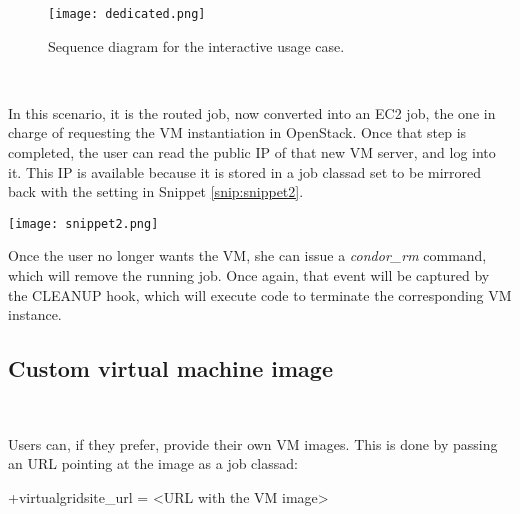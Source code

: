 \documentclass[a4paper]{jpconf}
\begin{document}
\begin{figure}[h]
    \centering
    \texttt{[image: dedicated.png]}
    \caption{Sequence diagram for the interactive usage case.}
    \label{fig:interactive}
\end{figure}

~

In this scenario, it is the routed job, now converted into an EC2 job, 
the one in charge of requesting the VM instantiation in OpenStack.
Once that step is completed, the user can read the public IP of that new VM server, and log into it. 
This IP is available because it is stored in a job classad set to be mirrored back with the setting in Snippet \ref{snip:snippet2}.

\begin{snippet}[h]
    \centering
    \renewcommand\figurename{Snippet}
    \texttt{[image: snippet2.png]}
    \caption{Setup for a classad to be mirrored from the routed job to the source job.}
    \label{snip:snippet2}
\end{snippet}


Once the user no longer wants the VM, she can issue a \textit{condor\_rm}
command, which will remove the running job. 
Once again, that event will be captured by the CLEANUP hook, which will execute
code to terminate the corresponding VM instance.


\subsection{Custom virtual machine image}

~

Users can, if they prefer, provide their own VM images. 
This is done by passing an URL pointing at the image as a job classad:
\begin{center}
    +virtualgridsite\_url = \textless URL with the VM image\textgreater
\end{center}
\end{document}
